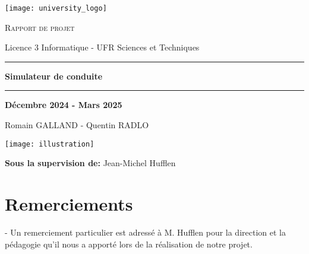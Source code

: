 \documentclass[a4paper,12pt]{report}
\begin{document}
    \begin{titlepage}

        \begin{center}
            \vspace{2cm}
            \texttt{[image: university\_logo]}\par
        \end{center}



        \begin{center}
            \vspace{0.2cm}
            {\scshape \large{Rapport de projet} \par}
            Licence 3 Informatique - UFR Sciences et Techniques
            \vspace{0.4cm}
            \hrule
            \vspace{0.4cm}
            {\huge\bfseries Simulateur de conduite \par}
            \vspace{0.4cm}
            \hrule
            \vspace{1cm}
            {\large\bfseries Décembre 2024 - Mars 2025 \par}
            Romain GALLAND - Quentin RADLO
            \vspace{1cm}
            \begin{center}
                \texttt{[image: illustration]}
            \end{center}


            \vspace{1cm}
            {\bfseries Sous la supervision de:} Jean-Michel Hufflen \\


        \end{center}
    \end{titlepage}


    \newpage
    \section*{Remerciements}
    - Un remerciement particulier est adressé à M. Hufflen pour la direction et la pédagogie qu'il nous a apporté lors de la réalisation de notre projet.
\end{document}

